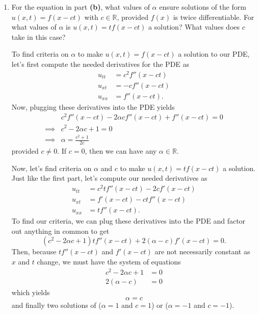 \documentclass[a4paper,12pt]{article}
\newcommand{\reals}{\mathbb{R}}
\begin{document}
\begin{enumerate}[label = \textbf{(\alph*)}]
            \item For the equation in part \textbf{(b)}, what values of $ \alpha $ ensure solutions of the form $ u(x,t) = f(x - ct) $ with $ c \in \reals $, provided $ f(x) $ is twice differentiable. For what values of $ \alpha $ is $ u(x,t) = t f(x - ct) $ a solution? What values does $ c $ take in this case?
            
            To find criteria on $ \alpha $ to make $ u(x,t) = f(x - ct) $ a solution to our PDE, let's first compute the needed derivatives for the PDE as
            \begin{align*}
                u_{tt} &= c^2 f''(x - ct) \\
                u_{xt} &= -c f''(x - ct) \\
                u_{xx} &= f''(x - ct). 
            \end{align*}
            Now, plugging these derivatives into the PDE yields
            \begin{align*}
                & c^2 f''(x - ct) - 2 \alpha c f''(x - ct) + f''(x - ct) = 0 \\
                \implies & c^2 - 2 \alpha c + 1 = 0 \\
                \implies & \alpha = \frac{c^2 + 1}{2c}
            \end{align*}
            provided $ c \neq 0 $. If $ c = 0 $, then we can have any $ \alpha \in \reals $.
            
            Now, let's find criteria on $ \alpha $ and $ c $ to make $ u(x,t) = t f(x - ct) $ a solution. Just like the first part, let's compute our needed derivatives as
            \begin{align*}
                u_{tt} &= c^2 t f''(x - ct) - 2c f'(x - ct) \\
                u_{xt} &= f'(x - ct) - c t f''(x - ct) \\
                u_{xx} &= t f''(x - ct). 
            \end{align*}
            To find our criteria, we can plug these derivatives into the PDE and factor out anything in common to get
            \[
                (c^2 - 2 \alpha c + 1) t f''(x - ct) + 2(\alpha - c) f'(x - ct) = 0.
            \]
            Then, because $ t f''(x - ct) $ and $ f'(x - ct) $ are not necessarily constant as $ x $ and $ t $ change, we must have the system of equations
            \begin{align*}
                c^2 - 2 \alpha c + 1 &= 0 \\
                2(\alpha - c) &= 0
            \end{align*}
            which yields
            \[
                \alpha = c
            \]
            and finally two solutions of ($ \alpha = 1 $ and $ c = 1 $) or ($ \alpha = -1 $ and $ c = -1 $).
            

\end{enumerate}
\end{document}
